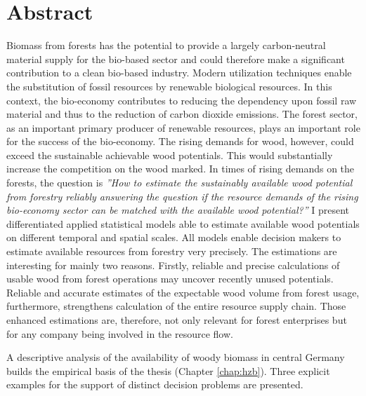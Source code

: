 \chapter*{Abstract}
\label{chap:Summary}
Biomass from forests has the potential to provide a largely carbon-neutral material supply for the bio-based sector and could therefore make a significant contribution to a clean bio-based industry. Modern utilization techniques enable the substitution of fossil resources by renewable biological resources. In this context, the bio-economy contributes to reducing the dependency upon fossil raw material and thus to the reduction of carbon dioxide emissions. The forest sector, as an important primary producer of renewable resources, plays an important role for the success of the bio-economy. The rising demands for wood, however, could exceed the sustainable achievable wood potentials. This would substantially increase the competition on the wood marked. In times of rising demands on the forests, the question is \textit{''How to estimate the sustainably available wood potential from forestry reliably answering the question if the resource demands of the rising bio-economy sector can be matched with the available wood potential?''} I present differentiated applied statistical models able to estimate available wood potentials on different temporal and spatial scales. All models enable decision makers to estimate available resources from forestry very precisely. The estimations are interesting for mainly two reasons. Firstly, reliable and precise calculations of usable wood from forest operations may uncover recently unused potentials. Reliable and accurate estimates of the expectable wood volume from forest usage, furthermore, strengthens calculation of the entire resource supply chain. Those enhanced estimations are, therefore, not only relevant for forest enterprises but for any company being involved in the resource flow.

A descriptive analysis of the availability of woody biomass in central Germany builds the empirical basis of the thesis (Chapter \ref{chap:hzb}). Three explicit examples for the support of distinct decision problems are presented.

